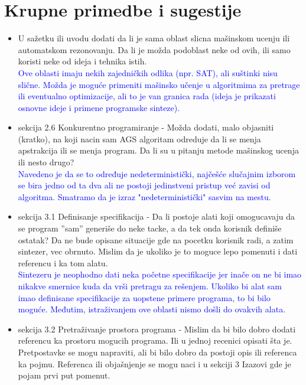 \documentclass[a4paper]{report}
\newcommand{\odgovor}[1]{\textcolor{blue}{#1}}
\begin{document}
\section{Krupne primedbe i sugestije}
\begin{itemize}
    \item U sažetku ili uvodu dodati da li je sama oblast slicna mašinskom ucenju ili automatskom rezonovanju. Da li je možda podoblast neke od ovih, ili samo koristi neke od ideja i tehnika istih.\\
	\odgovor{Ove oblasti imaju nekih zajedničkih odlika (npr. SAT), ali suštinki nisu slične. Možda je moguće primeniti mašinsko učenje u algoritmima za pretrage ili eventualno optimizacije, ali to je van granica rada (ideja je prikazati osnovne ideje i primene programske sinteze).}
    \item sekcija 2.6 Konkurentno programiranje - Možda dodati, malo objasniti (kratko), na koji nacin sam AGS algoritam odreduje da li se menja apstrakcija ili se menja program. Da li su u pitanju metode mašinskog ucenja ili nesto drugo?\\
	\odgovor{Navedeno je da se to određuje nedeterministički, najčešće slučajnim izborom se bira jedno od ta dva ali ne postoji jedinstveni pristup već zavisi od algoritma. Smatramo da je izraz "nedeterministički" sasvim na mestu.}
    \item sekcija 3.1 Definisanje specifikacija - Da li postoje alati koji omogucavaju da se program ''sam'' generiše do neke tacke, a da tek onda korisnik definiše ostatak? Da ne bude opisane situacije gde na pocetku korisnik radi, a zatim sintezer, vec obrnuto. Mislim da je ukoliko je to moguce lepo pomenuti i dati referencu i ka tom alatu.\\
    \odgovor {Sintezeru je neophodno dati neka početne specifikacije jer inače on ne bi imao nikakve smernice kuda da vrši pretragu za rešenjem. Ukoliko bi alat sam imao definisane specifikacije za uopstene primere programa, to bi bilo moguće. Međutim, istraživanjem ove oblasti nismo došli do ovakvih alata.}
    \item sekcija 3.2 Pretraživanje prostora programa - Mislim da bi bilo dobro dodati referencu ka prostoru mogucih programa. Ili u jednoj recenici opisati šta je. Pretpostavke se mogu napraviti, ali bi bilo dobro da postoji opis ili referenca ka pojmu. Referenca ili objašnjenje se mogu naci i u sekciji 3 Izazovi gde je pojam prvi put pomenut.\\

\end{itemize}
\end{document}
